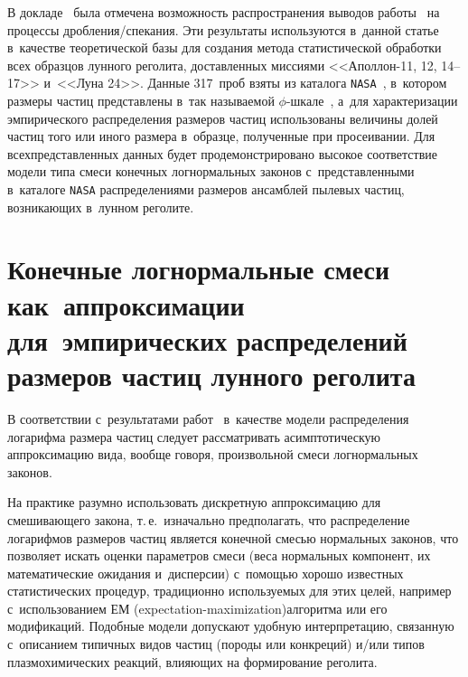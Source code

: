 \begin{multicols}{2}
{}

В докладе~\cite{SK2019} была отмечена возможность распространения выводов 
работы~\cite{Korolev2009} на процессы  
дроб\-ле\-ния/спе\-ка\-ния. Эти результаты используются в~данной статье 
в~качестве теоретической базы для создания метода статистической 
обработки всех образцов лунного реголита, доставленных миссиями 
<<Аполлон-11, 12, 14--17>> и~<<Луна 24>>. Данные 317~проб взяты из 
каталога \verb"NASA"~\cite{Graf1993}, в~котором размеры частиц 
представлены в~так называемой $\phi$-шка\-ле~\cite{Donoghue2016}, а~для 
характеризации эмпирического распределения размеров частиц использованы 
величины долей частиц того или иного размера в~образце, полученные при 
просеивании. Для всех\linebreak представленных данных будет продемонстрировано 
высокое соответствие модели типа смеси конечных логнормальных законов 
с~представленными в~каталоге \verb"NASA" распределениями размеров 
ансамб\-лей пылевых частиц, возникающих в~лунном реголите.


\section{Конечные логнормальные смеси как~аппроксимации для~эмпирических 
распределений размеров частиц лунного реголита}

В соответствии с~результатами работ~\cite{Korolev2009, SK2019} в~качестве 
модели распределения логарифма размера частиц следует рассматривать 
асимптотическую аппроксимацию вида, вообще говоря, произвольной смеси 
логнормальных законов. 

На практике разумно использовать дискрет\-ную 
аппроксимацию для смешивающего закона, т.\,е.\ изначально предполагать, 
что распределение логарифмов размеров частиц является конечной смесью 
нормальных законов, что позволяет искать оценки параметров смеси (веса 
нормальных компонент, их математические ожидания и~дисперсии) с~помощью 
хорошо известных статистических процедур, традиционно используемых для 
этих целей, например с~использованием ЕМ (expectation-maximization)\linebreak алгоритма или его модификаций. 
Подобные модели допускают удобную интерпретацию, связанную с~описанием 
типичных видов частиц (породы или конкреций) и/или типов плазмохимических\linebreak 
реакций, влияющих на формирование ре\-го\-лита.
{ %

}


\end{multicols}
